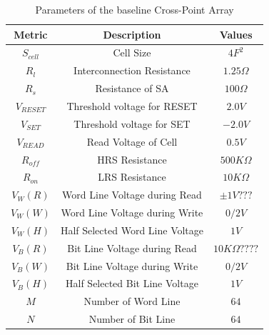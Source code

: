 \begin{table}[!b]
  \centering
  \scriptsize
    \scriptsize
  \caption{Parameters of the baseline Cross-Point Array}\label{table:parameter}
  \vspace{-5pt}
  \begin{tabular}{c|c|c}
    \hline    \hline
    \textbf{Metric} & \textbf{Description} & \textbf{Values} \\
    \hline
    \textbf{$S_{cell}$} & Cell Size & \textbf{$4F^2$} \\
    \textbf{$R_l$} &  Interconnection Resistance&\textbf{$1.25\Omega$} \\
    \textbf{$R_s$} &  Resistance of SA&\textbf{$100\Omega$} \\
    \textbf{$V_{RESET}$} & Threshold voltage for RESET&\textbf{$2.0V$} \\
    \textbf{$V_{SET}$} & Threshold voltage for SET&\textbf{$-2.0V$} \\
    \textbf{$V_{READ}$} & Read Voltage of Cell&\textbf{$0.5V$} \\
    \textbf{$R_{off}$} & HRS Resistance &\textbf{$500K\Omega$} \\
    \textbf{$R_{on}$} & LRS Resistance &\textbf{$10K\Omega$} \\
    \textbf{$V_{W}(R)$} & Word Line Voltage during Read &\textbf{$\pm 1V ???$} \\
    \textbf{$V_{W}(W)$} & Word Line Voltage during Write  &\textbf{$0 / 2V$} \\
    \textbf{$V_{W}(H)$} & Half Selected Word Line Voltage &\textbf{$1V$} \\
    \textbf{$V_{B}(R)$} & Bit Line Voltage during Read  &\textbf{$10K\Omega ????$} \\
    \textbf{$V_{B}(W)$} & Bit Line Voltage during Write  &\textbf{$0 / 2V$} \\
    \textbf{$V_{B}(H)$} & Half Selected Bit Line Voltage &\textbf{$1V$} \\
    \textbf{$M$} & Number of Word Line &\textbf{$64$} \\
    \textbf{$N$} & Number of Bit Line &\textbf{$64$} \\

    \hline
  \end{tabular}
  \vspace{-10pt}
\end{table}

